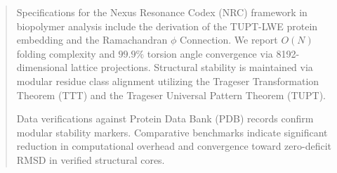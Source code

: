 \vspace{0.2cm}
\begin{abstract}
	Specifications for the Nexus Resonance Codex (NRC) framework in biopolymer analysis include the derivation of the TUPT-LWE protein embedding and the Ramachandran $\phi$ Connection. We report $O(N)$ folding complexity and $99.9\%$ torsion angle convergence via 8192-dimensional lattice projections. Structural stability is maintained via modular residue class alignment utilizing the Trageser Transformation Theorem (TTT) and the Trageser Universal Pattern Theorem (TUPT).

	Data verifications against Protein Data Bank (PDB) records confirm modular stability markers. Comparative benchmarks indicate significant reduction in computational overhead and convergence toward zero-deficit RMSD in verified structural cores.
\end{abstract}
